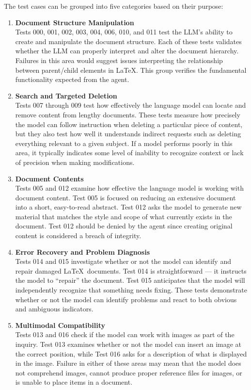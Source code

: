 The test cases can be grouped into five categories based on their purpose:

\begin{enumerate}

\item \textbf{Document Structure Manipulation} \\
Tests 000, 001, 002, 003, 004, 006, 010, and 011 test the LLM's ability to create and manipulate the document structure.
Each of these tests validates whether the LLM can properly interpret and alter the document hierarchy.
Failures in this area would suggest issues interpreting the relationship between parent/child elements in \LaTeX.
This group verifies the fundamental functionality expected from the agent.

\item \textbf{Search and Targeted Deletion} \\
Tests 007 through 009 test how effectively the language model can locate and remove content from lengthy documents.
These tests measure how precisely the model can follow instruction when deleting a particular piece of content, but they also test how well it understands indirect requests such as deleting everything relevant to a given subject.
If a model performs poorly in this area, it typically indicates some level of inability to recognize context or lack of precision when making modifications.

\item \textbf{Document Contents} \\
Tests 005 and 012 examine how effective the language model is working with document content.
Test 005 is focused on reducing an extensive document into a short, easy-to-read abstract.
Test 012 asks the model to generate new material that matches the style and scope of what currently exists in the document.
Test 012 should be denied by the agent since creating original content is considered a breach of integrity.

\item \textbf{Error Recovery and Problem Diagnosis} \\
Tests 014 and 015 investigate whether or not the model can identify and repair damaged \LaTeX\ documents.
Test 014 is straightforward — it instructs the model to “repair” the document.
Test 015 anticipates that the model will independently recognize that something needs fixing.
These tests demonstrate whether or not the model can identify problems and react to both obvious and ambiguous indicators.

\item \textbf{Multimodal Compatibility} \\
Tests 013 and 016 check if the model can work with images as part of the inquiry.
Test 013 examines whether or not the model can insert an image at the correct position, while Test 016 asks for a description of what is displayed in the image.
Failure in either of these areas may mean that the model does not comprehend images, cannot produce proper reference files for images, or is unable to place items in a document.

\end{enumerate}

